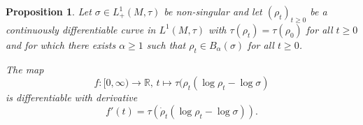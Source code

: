 \documentclass[12pt,a4paper]{amsart}
\newcommand{\1}{\mathds{1}}
\newcommand{\IR}{\mathbb R}
\theoremstyle{plain}
\newtheorem{proposition}{Proposition}[section]
\theoremstyle{definition}
\theoremstyle{remark}
\begin{document}
\begin{proposition}\label{prop:deriv_entropy_semifinite}
Let $\sigma\in L^1_+(M,\tau)$ be non-singular and let $(\rho_t)_{t\geq 0}$ be a continuously differentiable curve in $L^1(M,\tau)$ with $\tau(\rho_t)=\tau(\rho_0)$ for all $t\geq 0$ and for which there exists $\alpha\geq 1$ such that $\rho_t\in B_\alpha(\sigma)$ for all $t\geq 0$.

The map
\begin{equation*}
f\colon[0,\infty)\to \IR,\,t\mapsto \tau(\rho_t(\log\rho_t-\log \sigma)
\end{equation*}
is differentiable with derivative
\begin{equation*}
f'(t)=\tau(\dot\rho_t(\log\rho_t-\log\sigma)).
\end{equation*}
\end{proposition}
\end{document}
